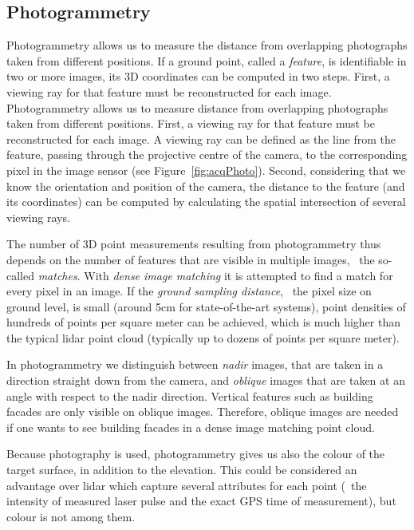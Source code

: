 

\subsection{Photogrammetry}
Photogrammetry allows us to measure the distance from overlapping photographs taken from different positions. 
If a ground point, called a \emph{feature}, is identifiable in two or more images, its 3D coordinates can be computed in two steps. 
First, a viewing ray for that feature must be reconstructed for each image. 
Photogrammetry allows us to measure distance from overlapping photographs taken from different positions. 
First, a viewing ray for that feature must be reconstructed for each image. 
A viewing ray can be defined as the line from the feature, passing through the projective centre of the camera, to the corresponding pixel in the image sensor (see Figure~\ref{fig:acqPhoto}). 
Second, considering that we know the orientation and position of the camera, the distance to the feature (and its coordinates) can be computed by calculating the spatial intersection of several viewing rays.


The number of 3D point measurements resulting from photogrammetry thus depends on the number of features that are visible in multiple images, \ie\ the so-called \emph{matches}.
With \emph{dense image matching} it is attempted to find a match for every pixel in an image. 
If the \emph{ground sampling distance}, \ie\ the pixel size on ground level, is small (around 5cm for state-of-the-art systems), point densities of hundreds of points per square meter can be achieved, which is much higher than the typical lidar point cloud (typically up to dozens of points per square meter). 

In photogrammetry we distinguish between \emph{nadir} images, that are taken in a direction straight down from the camera, and \emph{oblique} images that are taken at an angle with respect to the nadir direction.
Vertical features such as building facades are only visible on oblique images.
Therefore, oblique images are needed if one wants to see building facades in a dense image matching point cloud.

Because photography is used, photogrammetry gives us also the colour of the target surface, in addition to the elevation.
This could be considered an advantage over lidar which capture several attributes for each point (\eg\ the intensity of measured laser pulse and the exact GPS time of measurement), but colour is not among them.


